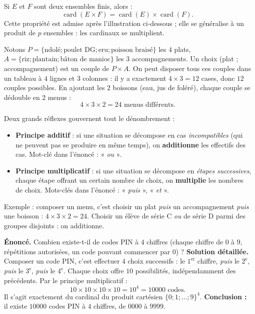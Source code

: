 \documentclass[11pt]{article}
\begin{document}
\begin{propriete}
Si $E$ et $F$ sont deux ensembles finis, alors :
\[ \operatorname{card}(E \times F) = \operatorname{card}(E) \times \operatorname{card}(F). \]
Cette propriété est admise après l'illustration ci-dessous ; elle se généralise à un produit de $p$ ensembles : les cardinaux se multiplient.
\end{propriete}

\begin{exemplebox}
Notons $P = \{\text{ndolé} ; \text{poulet DG} ; \text{eru} ; \text{poisson braisé}\}$ les $4$ plats, $A = \{\text{riz} ; \text{plantain} ; \text{bâton de manioc}\}$ les $3$ accompagnements. Un choix (plat ; accompagnement) est un couple de $P \times A$. On peut disposer tous ces couples dans un tableau à $4$ lignes et $3$ colonnes : il y a exactement $4 \times 3 = 12$ cases, donc $12$ couples possibles. En ajoutant les $2$ boissons (eau, jus de foléré), chaque couple se dédouble en $2$ menus :
\[ 4 \times 3 \times 2 = 24 \text{ menus différents.} \]
\end{exemplebox}

\begin{aretenir}
Deux grands réflexes gouvernent tout le dénombrement :
\begin{itemize}
\item \textbf{Principe additif} : si une situation se décompose en cas \emph{incompatibles} (qui ne peuvent pas se produire en même temps), on \textbf{additionne} les effectifs des cas. Mot-clé dans l'énoncé : « \emph{ou} ».
\item \textbf{Principe multiplicatif} : si une situation se décompose en \emph{étapes successives}, chaque étape offrant un certain nombre de choix, on \textbf{multiplie} les nombres de choix. Mots-clés dans l'énoncé : « \emph{puis} », « \emph{et} ».
\end{itemize}
Exemple : composer un menu, c'est choisir un plat \emph{puis} un accompagnement \emph{puis} une boisson : $4 \times 3 \times 2 = 24$. Choisir un élève de série C \emph{ou} de série D parmi des groupes disjoints : on additionne.
\end{aretenir}

\begin{exoresolu}
\textbf{Énoncé.} Combien existe-t-il de codes PIN à $4$ chiffres (chaque chiffre de $0$ à $9$, répétitions autorisées, un code pouvant commencer par $0$) ?
\tcblower
\textbf{Solution détaillée.} Composer un code PIN, c'est effectuer $4$ choix successifs : le $1^{\text{er}}$ chiffre, \emph{puis} le $2^{\text{e}}$, \emph{puis} le $3^{\text{e}}$, \emph{puis} le $4^{\text{e}}$. Chaque choix offre $10$ possibilités, indépendamment des précédents. Par le principe multiplicatif :
\[ 10 \times 10 \times 10 \times 10 = 10^4 = \num{10000} \text{ codes.} \]
Il s'agit exactement du cardinal du produit cartésien $\{0 ; 1 ; \dots ; 9\}^4$. \textbf{Conclusion :} il existe $\num{10000}$ codes PIN à $4$ chiffres, de $0000$ à $9999$.
\end{exoresolu}
\end{document}
